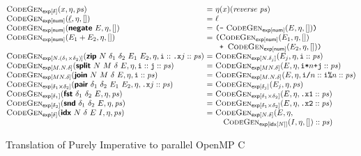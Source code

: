 \begin{figure}
    \begin{minipage}{1.0\linewidth}
      \begin{displaymath}
        \begin{array}{@{}l@{~}c@{~}l@{}}
          \codegenExp{\delta}{x, \eta, \mathit{ps}}
          &=& \eta(x)(\mathit{reverse}~\mathit{ps})
          \\
          \codegenExp{\num}{\underline{\ell}, \eta, []}
          &=& \ell
          \\
          \codegenExp{\num}{\prim{negate}~E, \eta, []}
          &=& \texttt{(}\texttt{-}~\codegenExp{\num}{E, \eta, []}\texttt{)}
          \\
          \codegenExp{\num}{E_1 + E_2, \eta, []}
          &=& \texttt{(}
          \begin{array}[t]{@{}l}
            \codegenExp{\num}{E_1, \eta, []}\\
            \texttt{+ }\codegenExp{\num}{E_2, \eta, []}\texttt{)}
          \end{array}
          \\
          \codegenExp{N.(\delta_1 \times \delta_2)}{\prim{zip}~N~\delta_1~\delta_2~E_1~E_2, \eta, \texttt{i} :: \texttt{.x}j :: \mathit{ps}}
          &=& \codegenExp{N.\delta_j}{E_j, \eta, \texttt{i} :: \mathit{ps}}
          \\
          \codegenExp{M.N.\delta}{\prim{split}~N~M~\delta~E, \eta, \texttt{i} :: \texttt{j} :: \mathit{ps}}
          &=& \codegenExp{MN.\delta}{E, \eta, \texttt{i*}n\texttt{+j} :: \mathit{ps}}
          \\
          \codegenExp{MN.\delta}{\prim{join}~N~M~\delta~E, \eta, \texttt{i} :: \mathit{ps}}
          &=& \codegenExp{M.N.\delta}{E, \eta, \texttt{i/}n :: \texttt{i\%}n :: \mathit{ps}}
          \\
          \codegenExp{\delta_1 \times \delta_2}{\prim{pair}~\delta_1~\delta_2~E_1~E_2, \eta, \texttt{.x}j :: \mathit{ps}}
          &=& \codegenExp{\delta_j}{E_j, \eta, \mathit{ps}}
          \\
          \codegenExp{\delta_1}{\prim{fst}~\delta_1~\delta_2~E, \eta, \mathit{ps}}
          &=& \codegenExp{\delta_1 \times \delta_2}{E, \eta, \texttt{.x1} :: \mathit{ps}}
          \\
          \codegenExp{\delta_2}{\prim{snd}~\delta_1~\delta_2~E, \eta, \mathit{ps}}
          &=& \codegenExp{\delta_1 \times \delta_2}{E, \eta, \texttt{.x2} :: \mathit{ps}}
          \\
          \codegenExp{\delta}{\prim{idx}~N~\delta~E~I, \eta, \mathit{ps}}
          &=&
          \begin{array}[t]{@{}l}
            \textsc{CodeGen}_{\mathsf{exp}[N.\delta]}(E, \eta,\\ \quad\codegenExp{\tyidx[N]}{I, \eta, []} :: \mathit{ps})
          \end{array}
        \end{array}
      \end{displaymath}
      \label{fig:codegen-exp}
    \end{minipage}
  
    \caption{Translation of Purely Imperative \DPIA to parallel OpenMP C}
    \label{fig:codegen}
  \end{figure}